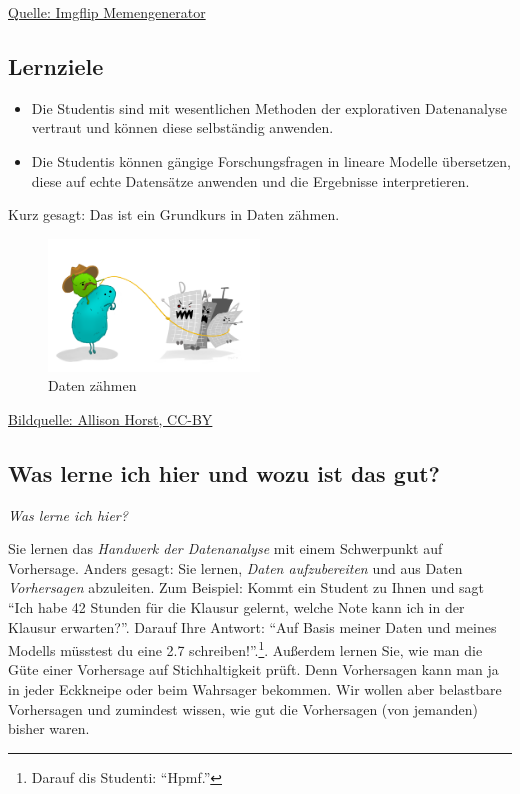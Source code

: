 \documentclass[
  a4paper,
  DIV=11]{scrreprt}
\begin{document}
\href{https://imgflip.com/memegenerator}{Quelle: Imgflip Memengenerator}

\subsection{Lernziele}\label{lernziele}

\begin{itemize}
\item
  Die Studentis sind mit wesentlichen Methoden der explorativen
  Datenanalyse vertraut und können diese selbständig anwenden.
\item
  Die Studentis können gängige Forschungsfragen in lineare Modelle
  übersetzen, diese auf echte Datensätze anwenden und die Ergebnisse
  interpretieren.
\end{itemize}

Kurz gesagt: Das ist ein Grundkurs in Daten zähmen.

\begin{figure}[H]

{\centering \includegraphics[width=0.5\textwidth,height=\textheight]{img/datenzaehmen.png}

}

\caption{Daten zähmen}

\end{figure}%

\href{https://github.com/allisonhorst/stats-illustrations}{Bildquelle:
Allison Horst, CC-BY}

\subsection{Was lerne ich hier und wozu ist das
gut?}\label{was-lerne-ich-hier-und-wozu-ist-das-gut}

\emph{Was lerne ich hier?}

Sie lernen das \emph{Handwerk der Datenanalyse} mit einem Schwerpunkt
auf Vorhersage. Anders gesagt: Sie lernen, \emph{Daten aufzubereiten}
und aus Daten \emph{Vorhersagen} abzuleiten. Zum Beispiel: Kommt ein
Student zu Ihnen und sagt ``Ich habe 42 Stunden für die Klausur gelernt,
welche Note kann ich in der Klausur erwarten?''. Darauf Ihre Antwort:
``Auf Basis meiner Daten und meines Modells müsstest du eine 2.7
schreiben!''.\footnote{Darauf dis Studenti: ``Hpmf.''}. Außerdem lernen
Sie, wie man die Güte einer Vorhersage auf Stichhaltigkeit prüft. Denn
Vorhersagen kann man ja in jeder Eckkneipe oder beim Wahrsager bekommen.
Wir wollen aber belastbare Vorhersagen und zumindest wissen, wie gut die
Vorhersagen (von jemanden) bisher waren.
\end{document}
